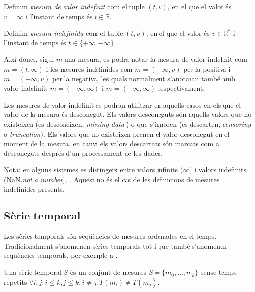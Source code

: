\begin{definition}
  \label{def:model:mesura_valor_indefinit}
  Definim \emph{mesura de valor indefinit} com el tuple $(t,v)$, en el
  que el valor és $v=\infty$ i l'instant de temps és
  $t\in\bar{\mathbb{R}}$.
\end{definition}

\begin{definition}
  \label{def:model:mesura_indefinida}
  Definim \emph{mesura indefinida} com el tuple $(t,v)$, en el que el
  valor és $v\in\mathbb{R}^*$ i l'instant de temps és
  $t\in\{+\infty,-\infty\}$.
\end{definition}

Així doncs, sigui $m$ una mesura, es podrà notar la mesura de valor indefinit com  $m=(t,\infty)$ i les mesures indefinides com $m=(+\infty,v)$ per la positiva  i $m=(-\infty,v)$ per la negativa, les quals normalment s'anotaran també amb valor indefinit: $m=(+\infty,\infty)$ i $m=(-\infty,\infty)$ respectivament.


Les mesures de valor indefinit es podran utilitzar en aquells casos en els que el valor de la mesura és desconegut. Els valors desconeguts  són aquells valors que no existeixen (es desconeixen, \emph{missing data} ) o que s'ignoren (es descarten, \emph{censoring} o \emph{truncation}). Els valors que no existeixen prenen el valor desconegut en el moment de la mesura, en canvi els valors descartats són marcats com a desconeguts després d'un processament de les dades. 

Nota: en alguns sistemes es distingeix entre valors infinits ($\infty$) i valors indefinits (NaN,\emph{not a number}), \cite{wiki:ieee754}. Aquest no és el cas de les definicions de mesures indefinides presents.



\subsection{Sèrie temporal}
\label{sec:model:serietemporal}

Les sèries temporals són seqüències de mesures ordenades en el temps. 
Tradicionalment s'anomenen sèries temporals tot i que també s'anomenen seqüències temporals, per exemple a \cite{last:hetland}.

\begin{definition}
  \label{def:serie_temporal}
  Una sèrie temporal $S$ és un conjunt de mesures
  $S=\{m_0,\ldots,m_k\}$ sense temps repetits
  $\forall i,j: i\leq k, j\leq k, i\neq j : T(m_i)\neq T(m_j)$.
\end{definition}

